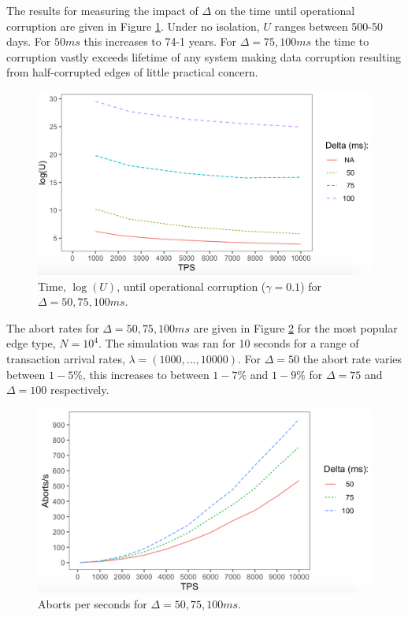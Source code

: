 \documentclass[sigplan,10pt]{acmart}
\begin{document}
The results for measuring the impact of $\Delta$ on the time until operational corruption are given in Figure \ref{time-to-corruption-results}. Under no isolation, $U$ ranges between 500-50 days. For $50ms$ this increases to 74-1 years. For $\Delta = 75, 100ms$ the time to corruption vastly exceeds lifetime of any system making data corruption resulting from half-corrupted edges of little practical concern.

\begin{figure}[h]
  \centering
  \includegraphics[width=\linewidth]{./images/delta_50_75_100}
  \caption{Time, $\log(U)$, until operational corruption ($\gamma = 0.1$) for $\Delta = 50, 75, 100ms$.}
  \label{time-to-corruption-results}
\end{figure}

The abort rates for $\Delta = 50, 75, 100ms$ are given in Figure \ref{aborts-results} for the most popular edge type, $N=10^4$. The simulation was ran for 10 seconds for a range of transaction arrival rates, $\lambda = (1000, ..., 10000)$. For $\Delta = 50$ the abort rate varies between $1-5\%$, this increases to between $1-7\%$ and $1-9\%$ for $\Delta = 75$ and $\Delta = 100$ respectively.

\begin{figure}[h]
  \centering
  \includegraphics[width=\linewidth]{./images/aborts_50_75_100}
  \caption{Aborts per seconds for $\Delta = 50, 75, 100ms$.}
  \label{aborts-results}
\end{figure}
\end{document}
